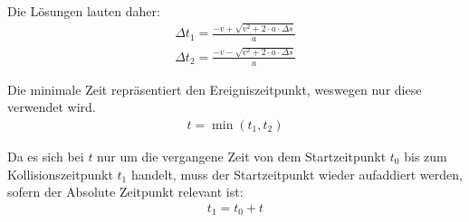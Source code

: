 Die Lösungen lauten daher:
\begin{align}
    \Delta t_1 = \frac{-v + \sqrt{v^2 + 2 \cdot a \cdot \Delta s}}{a}\\
    \Delta t_2 = \frac{-v - \sqrt{v^2 + 2 \cdot a \cdot \Delta s}}{a}
\end{align}

Die minimale Zeit repräsentiert den Ereigniszeitpunkt, weswegen nur diese verwendet wird.
\begin{align}
    t = \min(t_1, t_2)
\end{align}

Da es sich bei $t$ nur um die vergangene Zeit von dem Startzeitpunkt $t_0$ bis zum Kollisionszeitpunkt $t_1$ handelt,
muss der Startzeitpunkt wieder aufaddiert werden, sofern der Absolute Zeitpunkt relevant ist:
\begin{align}
    t_1 = t_0 + t
\end{align}
